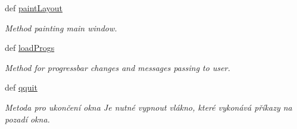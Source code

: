 \begin{DoxyCompactItemize}
def \hyperlink{classmnWindow_1_1App_a3a711688d2463a65d43a0a9dcc19276c}{paint\-Layout}
\begin{DoxyCompactList}\small\item\em Method painting main window. \end{DoxyCompactList}\item 
def \hyperlink{classmnWindow_1_1App_aa07a9b47b0fc8969a970edff8ecc1b56}{load\-Progs}
\begin{DoxyCompactList}\small\item\em Method for progressbar changes and messages passing to user. \end{DoxyCompactList}\item 
def \hyperlink{classmnWindow_1_1App_a6db9e81dd9a0225e260c43852f6bdcc4}{qquit}
\begin{DoxyCompactList}\small\item\em Metoda pro ukončení okna Je nutné vypnout vlákno, které vykonává příkazy na pozadí okna. \end{DoxyCompactList}\end{DoxyCompactItemize}
